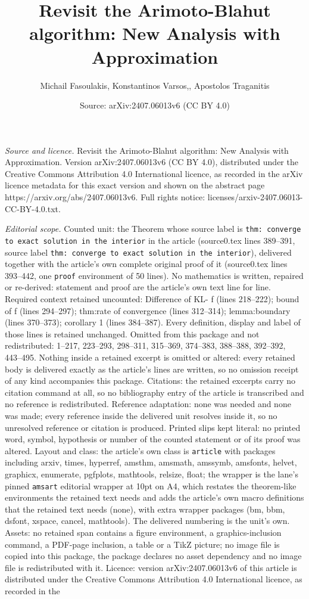 \documentclass[10pt,a4paper]{amsart}
\title[Revisit the Arimoto-Blahut algorithm: New Analysis with Appr]{Revisit the Arimoto-Blahut algorithm: New Analysis with Approximation}
\author{Michail Fasoulakis, Konstantinos Varsos,, Apostolos Traganitis}
\date{Source: arXiv:2407.06013v6 (CC BY 4.0)}
\begin{document}
\maketitle

\noindent\emph{Source and licence.} Revisit the Arimoto-Blahut algorithm: New Analysis with Approximation. Version arXiv:2407.06013v6 (CC BY 4.0), distributed under the Creative Commons Attribution 4.0 International licence, as recorded in the arXiv licence metadata for this exact version and shown on the abstract page https://arxiv.org/abs/2407.06013v6. Full rights notice: licenses/arxiv-2407.06013-CC-BY-4.0.txt.\par\smallskip

\noindent\textit{Editorial scope.} Counted unit: the Theorem whose source label is \texttt{thm: converge to exact solution in the interior} in the article (source0.tex lines 389--391, source label \texttt{thm: converge to exact solution in the interior}), delivered together with the article's own complete original proof of it (source0.tex lines 393--442, one \texttt{proof} environment of 50 lines). No mathematics is written, repaired or re-derived: statement and proof are the article's own text line for line. Required context retained uncounted: Difference of KL- f (lines 218--222); bound of f (lines 294--297); thm:rate of convergence (lines 312--314); lemma:boundary (lines 370--373); corollary 1 (lines 384--387). Every definition, display and label of those lines is retained unchanged. Omitted from this package and not redistributed: 1--217, 223--293, 298--311, 315--369, 374--383, 388--388, 392--392, 443--495. Nothing inside a retained excerpt is omitted or altered: every retained body is delivered exactly as the article's lines are written, so no omission receipt of any kind accompanies this package. Citations: the retained excerpts carry no citation command at all, so no bibliography entry of the article is transcribed and no reference is redistributed. Reference adaptation: none was needed and none was made; every reference inside the delivered unit resolves inside it, so no unresolved reference or citation is produced. Printed slips kept literal: no printed word, symbol, hypothesis or number of the counted statement or of its proof was altered. Layout and class: the article's own class is \texttt{article} with packages including arxiv, times, hyperref, amsthm, amsmath, amssymb, amsfonts, helvet, graphicx, enumerate, pgfplots, mathtools, relsize, float; the wrapper is the lane's pinned \texttt{amsart} editorial wrapper at 10pt on A4, which restates the theorem-like environments the retained text needs and adds the article's own macro definitions that the retained text needs (none), with extra wrapper packages (bm, bbm, dsfont, xspace, cancel, mathtools). The delivered numbering is the unit's own. Assets: no retained span contains a figure environment, a graphics-inclusion command, a PDF-page inclusion, a table or a TikZ picture; no image file is copied into this package, the package declares no asset dependency and no image file is redistributed with it. Licence: version arXiv:2407.06013v6 of this article is distributed under the Creative Commons Attribution 4.0 International licence, as recorded in the 
\end{document}
